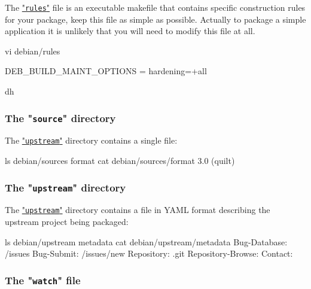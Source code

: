The \href{https://www.debian.org/doc/debian-policy/ch-source.html#main-building-script-debian-rules}{"\texttt{rules}"} file is an executable makefile 
that contains specific construction rules for your package, keep this file as simple as possible. 
Actually to package a simple application it is unlikely that you will need to modify this file at all. 
{\footnotesize{
\begin{script}
 vi debian/rules


 DEB\_BUILD\_MAINT\_OPTIONS = hardening=+all

\var{\%:}
\qquad\qquad dh 
\end{script}
}}

\subsubsection{The "\texttt{source}" directory}

The \href{https://wiki.debian.org/debian/upstream}{"\texttt{upstream}"}  directory contains a single file: 
{\footnotesize{
\begin{script}
 ls debian/sources
format
 cat debian/sources/format
3.0 (quilt)
\end{script}
}}

\subsubsection{The "\texttt{upstream}" directory}

The \href{https://wiki.debian.org/debian/upstream}{"\texttt{upstream}"} directory contains a file in YAML format describing the upstream project being packaged:
{\footnotesize{
\begin{script}
 ls debian/upstream
metadata
 cat debian/upstream/metadata
Bug-Database: \gitprog/issues
Bug-Submit: \gitprog/issues/new
Repository: \gitprog.git
Repository-Browse: \gitprog
Contact: \email
{}
\end{script}
}}

\subsubsection{The "\texttt{watch}" file}
\label{debwatch}

